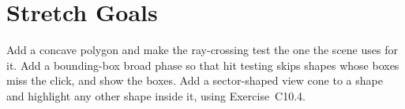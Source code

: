 \section{Stretch Goals}

Add a concave polygon and make the ray-crossing test the one the scene uses for it. Add a bounding-box broad phase so that hit testing skips shapes whose boxes miss the click, and show the boxes. Add a sector-shaped view cone to a shape and highlight any other shape inside it, using Exercise~C10.4.

